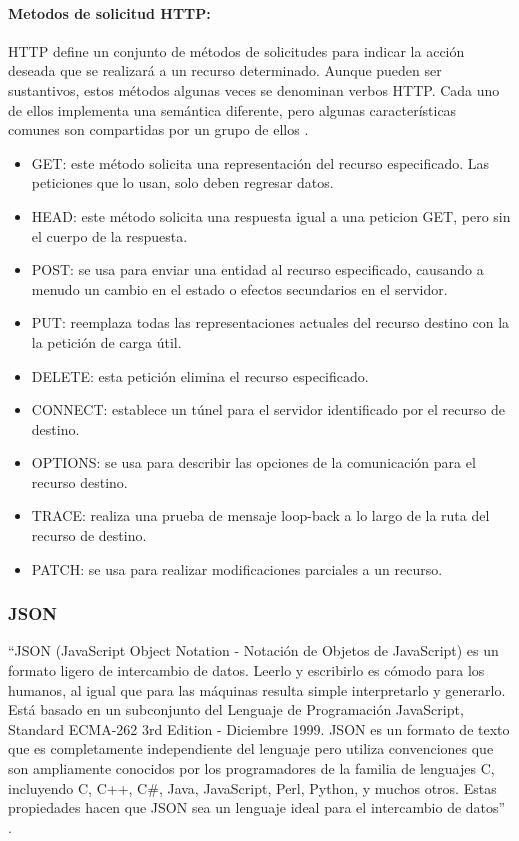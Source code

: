 \paragraph{Metodos de solicitud HTTP:}

HTTP define un conjunto de métodos de solicitudes para indicar la acción deseada que se realizará a un recurso determinado. Aunque pueden ser sustantivos, estos métodos algunas veces se denominan verbos HTTP. Cada uno de ellos implementa una semántica diferente, pero algunas características comunes son compartidas por un grupo de ellos \cite{HTTPM}.\\

\begin{itemize}
	\item GET: este método solicita una representación del recurso especificado. Las peticiones que lo usan, solo deben regresar datos.
	\item HEAD: este método solicita una respuesta igual a una peticion GET, pero sin el cuerpo de la respuesta.
	\item POST: se usa para enviar una entidad al recurso especificado, causando a menudo un cambio en el estado o efectos secundarios en el servidor.
	\item PUT: reemplaza todas las representaciones actuales del recurso destino con la la petición de carga útil.
	\item DELETE: esta petición elimina el recurso especificado.
	\item CONNECT: establece un túnel para el servidor identificado por el recurso de destino.
	\item OPTIONS: se usa para describir las opciones de la comunicación para el recurso destino.
	\item TRACE: realiza una prueba de mensaje loop-back a lo largo de la ruta del recurso de destino. 
	\item PATCH: se usa para realizar modificaciones parciales a un recurso.
\end{itemize}

\subsubsection{JSON}

``JSON (JavaScript Object Notation - Notación de Objetos de JavaScript) es un formato ligero de intercambio de datos. Leerlo y escribirlo es cómodo para los humanos, al igual que para las máquinas resulta simple interpretarlo y generarlo. Está basado en un subconjunto del Lenguaje de Programación JavaScript, Standard ECMA-262 3rd Edition - Diciembre 1999. JSON es un formato de texto que es completamente independiente del lenguaje pero utiliza convenciones que son ampliamente conocidos por los programadores de la familia de lenguajes C, incluyendo C, C++, C\#, Java, JavaScript, Perl, Python, y muchos otros. Estas propiedades hacen que JSON sea un lenguaje ideal para el intercambio de datos'' \cite{JSON}.\\

